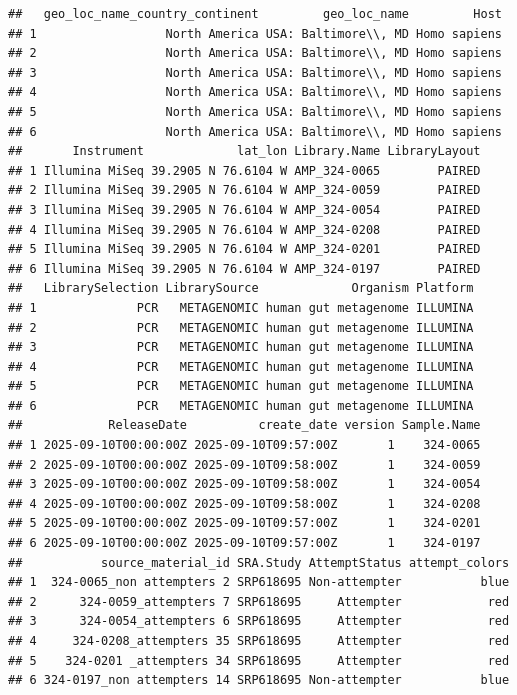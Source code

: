 \documentclass[
]{article}
\begin{document}
\begin{verbatim}
##   geo_loc_name_country_continent         geo_loc_name         Host
## 1                  North America USA: Baltimore\\, MD Homo sapiens
## 2                  North America USA: Baltimore\\, MD Homo sapiens
## 3                  North America USA: Baltimore\\, MD Homo sapiens
## 4                  North America USA: Baltimore\\, MD Homo sapiens
## 5                  North America USA: Baltimore\\, MD Homo sapiens
## 6                  North America USA: Baltimore\\, MD Homo sapiens
##       Instrument             lat_lon Library.Name LibraryLayout
## 1 Illumina MiSeq 39.2905 N 76.6104 W AMP_324-0065        PAIRED
## 2 Illumina MiSeq 39.2905 N 76.6104 W AMP_324-0059        PAIRED
## 3 Illumina MiSeq 39.2905 N 76.6104 W AMP_324-0054        PAIRED
## 4 Illumina MiSeq 39.2905 N 76.6104 W AMP_324-0208        PAIRED
## 5 Illumina MiSeq 39.2905 N 76.6104 W AMP_324-0201        PAIRED
## 6 Illumina MiSeq 39.2905 N 76.6104 W AMP_324-0197        PAIRED
##   LibrarySelection LibrarySource             Organism Platform
## 1              PCR   METAGENOMIC human gut metagenome ILLUMINA
## 2              PCR   METAGENOMIC human gut metagenome ILLUMINA
## 3              PCR   METAGENOMIC human gut metagenome ILLUMINA
## 4              PCR   METAGENOMIC human gut metagenome ILLUMINA
## 5              PCR   METAGENOMIC human gut metagenome ILLUMINA
## 6              PCR   METAGENOMIC human gut metagenome ILLUMINA
##            ReleaseDate          create_date version Sample.Name
## 1 2025-09-10T00:00:00Z 2025-09-10T09:57:00Z       1    324-0065
## 2 2025-09-10T00:00:00Z 2025-09-10T09:58:00Z       1    324-0059
## 3 2025-09-10T00:00:00Z 2025-09-10T09:58:00Z       1    324-0054
## 4 2025-09-10T00:00:00Z 2025-09-10T09:58:00Z       1    324-0208
## 5 2025-09-10T00:00:00Z 2025-09-10T09:57:00Z       1    324-0201
## 6 2025-09-10T00:00:00Z 2025-09-10T09:57:00Z       1    324-0197
##           source_material_id SRA.Study AttemptStatus attempt_colors
## 1  324-0065_non attempters 2 SRP618695 Non-attempter           blue
## 2      324-0059_attempters 7 SRP618695     Attempter            red
## 3      324-0054_attempters 6 SRP618695     Attempter            red
## 4     324-0208_attempters 35 SRP618695     Attempter            red
## 5    324-0201 _attempters 34 SRP618695     Attempter            red
## 6 324-0197_non attempters 14 SRP618695 Non-attempter           blue
\end{verbatim}
\end{document}
